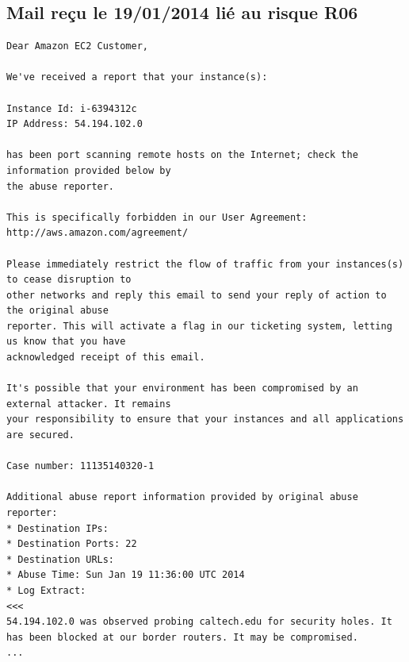 \documentclass[a4paper,11pt,french]{article}
\begin{document}
\subsection{Mail reçu le 19/01/2014 lié au risque R06}
\begin{verbatim}
Dear Amazon EC2 Customer,

We've received a report that your instance(s):

Instance Id: i-6394312c
IP Address: 54.194.102.0

has been port scanning remote hosts on the Internet; check the information provided below by
the abuse reporter.

This is specifically forbidden in our User Agreement: http://aws.amazon.com/agreement/

Please immediately restrict the flow of traffic from your instances(s) to cease disruption to
other networks and reply this email to send your reply of action to the original abuse
reporter. This will activate a flag in our ticketing system, letting us know that you have
acknowledged receipt of this email.

It's possible that your environment has been compromised by an external attacker. It remains
your responsibility to ensure that your instances and all applications are secured.

Case number: 11135140320-1

Additional abuse report information provided by original abuse reporter:
* Destination IPs:
* Destination Ports: 22
* Destination URLs:
* Abuse Time: Sun Jan 19 11:36:00 UTC 2014
* Log Extract:
<<<
54.194.102.0 was observed probing caltech.edu for security holes. It
has been blocked at our border routers. It may be compromised.
...
\end{verbatim}
\end{document}
